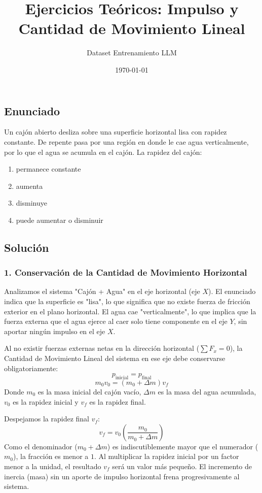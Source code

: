 \documentclass[12pt, a4paper]{article}
\title{Ejercicios Teóricos: Impulso y Cantidad de Movimiento Lineal}
\author{Dataset Entrenamiento LLM}
\date{\today}
\begin{document}
\maketitle

\subsection*{Enunciado}
Un cajón abierto desliza sobre una superficie horizontal lisa con rapidez constante. De repente pasa por una región en donde le cae agua verticalmente, por lo que el agua se acumula en el cajón. La rapidez del cajón:
\begin{enumerate}[label=\alph*)]
    \item permanece constante
    \item aumenta
    \item disminuye
    \item puede aumentar o disminuir
\end{enumerate}

\subsection*{Solución}

\subsubsection*{1. Conservación de la Cantidad de Movimiento Horizontal}
Analizamos el sistema "Cajón + Agua" en el eje horizontal (eje $X$). 
El enunciado indica que la superficie es "lisa", lo que significa que no existe fuerza de fricción exterior en el plano horizontal. El agua cae "verticalmente", lo que implica que la fuerza externa que el agua ejerce al caer solo tiene componente en el eje $Y$, sin aportar ningún impulso en el eje $X$.

Al no existir fuerzas externas netas en la dirección horizontal ($\sum F_x = 0$), la Cantidad de Movimiento Lineal del sistema en ese eje debe conservarse obligatoriamente:
$$ p_{\text{inicial}} = p_{\text{final}} $$
$$ m_0 v_0 = (m_0 + \Delta m) v_f $$
Donde $m_0$ es la masa inicial del cajón vacío, $\Delta m$ es la masa del agua acumulada, $v_0$ es la rapidez inicial y $v_f$ es la rapidez final.

Despejamos la rapidez final $v_f$:
$$ v_f = v_0 \left( \frac{m_0}{m_0 + \Delta m} \right) $$
Como el denominador ($m_0 + \Delta m$) es indiscutiblemente mayor que el numerador ($m_0$), la fracción es menor a $1$. Al multiplicar la rapidez inicial por un factor menor a la unidad, el resultado $v_f$ será un valor más pequeño. El incremento de inercia (masa) sin un aporte de impulso horizontal frena progresivamente al sistema.
\end{document}
